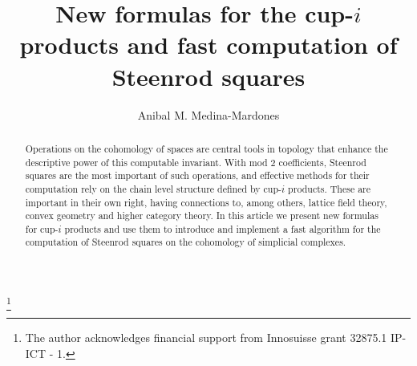 \documentclass{amsart}
\theoremstyle{definition}
\begin{document}
	
	\title{New formulas for the cup-$i$ products and fast computation of Steenrod squares}
	\author{Anibal M. Medina-Mardones}
	\thanks{The author acknowledges financial support from Innosuisse grant 32875.1 IP-ICT - 1.}
	\address{Max Planck Institute for Mathematics in Bonn}
	\address{Department of Mathematics, University of Notre Dame}
	
	\begin{abstract}
		Operations on the cohomology of spaces are central tools in topology that enhance the descriptive power of this computable invariant.
		With mod 2 coefficients, Steenrod squares are the most important of such operations, and effective methods for their computation rely on the chain level structure defined by cup-$i$ products.
		These are important in their own right, having connections to, among others, lattice field theory, convex geometry and higher category theory.
		In this article we present new formulas for cup-$i$ products and use them to introduce and implement a fast algorithm for the computation of Steenrod squares on the cohomology of simplicial complexes.
	\end{abstract}
	
	\maketitle
	\tableofcontents	
	
	
	
	
	
	
	
	
	
	
	
\end{document}
